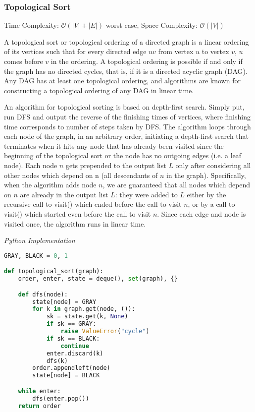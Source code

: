 \documentclass{article}
\newcommand{\bigO}{\ensuremath{\mathcal{O}}}
\begin{document}
    \subsubsection{Topological Sort}
    Time Complexity: $\bigO(|V| + |E|)$ worst case,  Space Complexity: $\bigO(|V|)$
    
    A topological sort or topological ordering of a directed graph is a linear ordering of its vertices such that for every directed edge $uv$ from vertex $u$ to vertex $v$, $u$ comes before $v$ in the ordering. A topological ordering is possible if and only if the graph has no directed cycles, that is, if it is a directed acyclic graph (DAG). Any DAG has at least one topological ordering, and algorithms are known for constructing a topological ordering of any DAG in linear time.
    
    An algorithm for topological sorting is based on depth-first search. Simply put, run DFS and output the reverse of the finishing times of vertices, where finishing time corresponds to number of steps taken by DFS. The algorithm loops through each node of the graph, in an arbitrary order, initiating a depth-first search that terminates when it hits any node that has already been visited since the beginning of the topological sort or the node has no outgoing edges (i.e. a leaf node). Each node $n$ gets prepended to the output list $L$ only after considering all other nodes which depend on n (all descendants of $n$ in the graph). Specifically, when the algorithm adds node $n$, we are guaranteed that all nodes which depend on $n$ are already in the output list $L$: they were added to $L$ either by the recursive call to visit() which ended before the call to visit $n$, or by a call to visit() which started even before the call to visit $n$. Since each edge and node is visited once, the algorithm runs in linear time.

\vspace{8pt} \emph{Python Implementation}
\begin{lstlisting}[language=Python]
GRAY, BLACK = 0, 1

def topological_sort(graph):
    order, enter, state = deque(), set(graph), {}

    def dfs(node):
        state[node] = GRAY
        for k in graph.get(node, ()):
            sk = state.get(k, None)
            if sk == GRAY:
                raise ValueError("cycle")
            if sk == BLACK:
                continue
            enter.discard(k)
            dfs(k)
        order.appendleft(node)
        state[node] = BLACK

    while enter:
        dfs(enter.pop())
    return order
\end{lstlisting}
\end{document}
